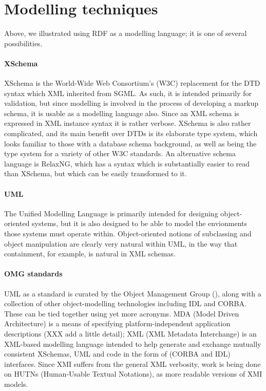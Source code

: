 \documentclass[11pt,twoside]{article}
\begin{document}
\section{Modelling techniques\label{s:techniques}}

Above, we illustrated using RDF as a modelling language; it is one of
several possibilities.

\paragraph{XSchema}

XSchema is the World-Wide Web Consortium's (W3C) replacement for the DTD syntax which XML inherited
from SGML.  As such, it is intended primarily for validation, but since
modelling is involved in the process of developing a markup schema,
it is usable as a modelling language also.  Since an XML schema is
expressed in XML instance syntax it is rather verbose.  XSchema is also
rather complicated, and its main benefit over DTDs is its elaborate type
system, which looks familiar to those with a database schema background,
as well as being the type system for a variety of other W3C standards.
An alternative schema language is RelaxNG, which has a syntax which
is substantially easier to read than XSchema, but which can be easily
transformed to it.

\paragraph{UML}

The Unified Modelling Language is primarily intended for designing
object-oriented systems, but it is also designed to be able to model the
envionments those systems must operate within.  Object-oriented notions
of subclassing and object manipulation are clearly very natural within
UML, in the way that containment, for example, is natural in XML schemas.

\paragraph{OMG standards}

UML as a standard is curated by the Object Management Group
(), along with
a collection of other object-modelling technologies including IDL and
CORBA.  These can be tied together using yet more acronyms.  MDA
(Model Driven Architecture) is a means of specifying
platform-independent application descriptions (XXX add a little
detail); XML (XML Metadata Interchange) is an XML-based modelling
language intended to help generate and exchange mutually consistent
XSchemas, UML and code in the form of (CORBA and IDL) interfaces.
Since XMI suffers from the general XML verbosity, work is being done
on HUTNs (Human-Usable Textual Notations), as more
readable versions of XMI models.
\end{document}
